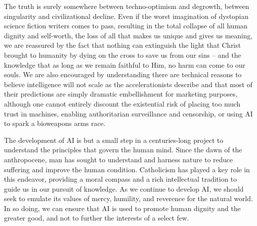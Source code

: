 \documentclass[sigplan,nonacm]{acmart}\settopmatter{printfolios=false,printccs=false,printacmref=false}
\begin{document}
The truth is surely somewhere between techno-optimism and degrowth, between singularity and civilizational decline. Even if the worst imagination of dystopian science fiction writers comes to pass, resulting in the total collapse of all human dignity and self-worth, the loss of all that makes us unique and gives us meaning, we are reassured by the fact that nothing can extinguish the light that Christ brought to humanity by dying on the cross to save us from our sins -- and the knowledge that as long as we remain faithful to Him, no harm can come to our souls. We are also encouraged by understanding there are technical reasons to believe intelligence will not scale as the accelerationists describe and that most of their predictions are simply dramatic embellishment for marketing purposes, although one cannot entirely discount the existential risk of placing too much trust in machines, enabling authoritarian surveillance and censorship, or using AI to spark a bioweapons arms race.



The development of AI is but a small step in a centuries-long project to understand the principles that govern the human mind. Since the dawn of the anthropocene, man has sought to understand and harness nature to reduce suffering and improve the human condition. Catholicism has played a key role in this endeavor, providing a moral compass and a rich intellectual tradition to guide us in our pursuit of knowledge. As we continue to develop AI, we should seek to emulate its values of mercy, humility, and reverence for the natural world. In so doing, we can ensure that AI is used to promote human dignity and the greater good, and not to further the interests of a select few.


\clearpage
\end{document}
